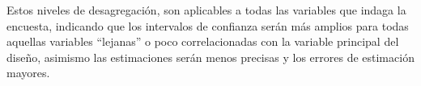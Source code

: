 \begin{itemize}
\begin{itemize}
	\end{itemize}
	
	Estos niveles de desagregación, son aplicables a todas las variables que indaga la encuesta, indicando que los intervalos de confianza serán más amplios para todas aquellas variables “lejanas” o poco correlacionadas con la variable principal del diseño, asimismo las estimaciones serán menos precisas y los errores  de estimación mayores.
	
	
\end{itemize}


